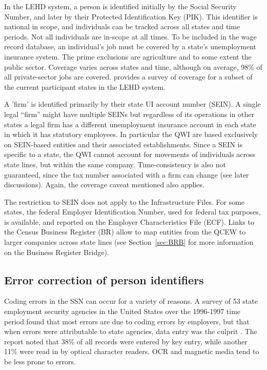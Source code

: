 In the LEHD system,  a person is identified initially by the Social
Security Number, and later by their Protected Identification Key
(PIK). This identifier is national in scope, and individuals can be tracked
across all states and time periods. Not all individuals are in-scope at all
times. To be included in the wage record database, an individual's job must
be covered by a state's unemployment insurance system. The prime exclusions
are agriculture and to some extent the public sector. Coverage varies across states and
time, although on average, 98\% of all private-sector jobs are covered.
 \citet{tp-2002-16} provides a survey of coverage for a subset of the
current participant states in the LEHD system.

A 'firm' is identified primarily by their state UI
account number (SEIN). A single legal ``firm'' might have multiple SEINs but regardless of its
operations in other states a legal firm has a different unemployment
insurance account in each state in which it has statutory employees.
In particular the QWI are based exclusively on
SEIN-based entities and their associated establishments. Since a SEIN is
specific to a state, the QWI cannot account for movements of individuals
across state lines, but within the same company. Time-consistency is also
not guaranteed, since the tax number associated with a firm can change (see
later discussions).  Again, the coverage caveat mentioned also applies. 

The restriction to SEIN does not apply to the Infrastructure Files. For
some states, the federal Employer Identification Number, used for federal
tax purposes, is available, and reported on the Employer Characteristics
File (ECF).  Links to the Census Business Register (BR)
allow to map entities from the QCEW to larger companies across state lines
(see Section~\ref{sec:BRB} for more information on the Business Register Bridge).

\subsection{Error correction of person identifiers}
\label{sec:ssnedit}

Coding errors in the SSN can occur for a variety of
reasons. A survey of 53 state employment security agencies in the United
States over the 1996-1997 time period found that most errors are due to
coding errors by employers, but that when errors were attributable to state
agencies, data entry was the culprit \citep[pg. ii]{BLS1997}. %
The report noted that 38\% of all records were entered by key entry, while
another 11\% were read in by optical character readers. OCR and magnetic
media tend to be less prone to errors. 

